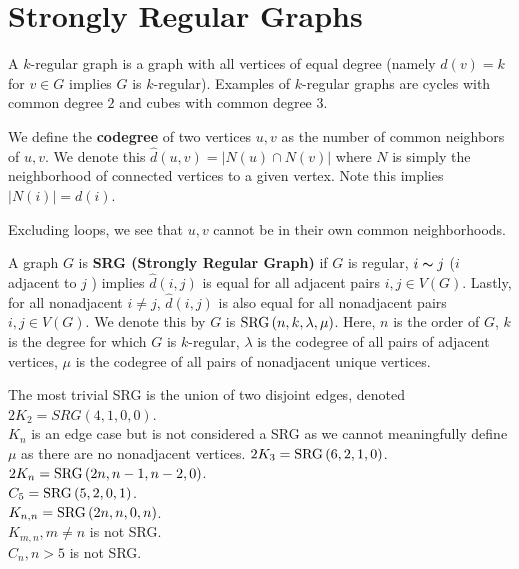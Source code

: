 \section{Strongly Regular Graphs}
\begin{recall}
	A $k$-regular graph is a graph with all vertices of equal degree (namely $d\left( v \right) = k$ for $v \in G$ implies $G$ is $k$-regular). Examples of $k$-regular graphs are cycles with common degree $2$ and cubes with common degree  $3$.
\end{recall}
\begin{definition}[Codegree]
	We define the \textbf{codegree} of two vertices $u, v$ as the number of common neighbors of $u, v$. We denote this $\hat{d}\left( u, v \right) = \left| N\left( u \right) \cap N\left( v \right)  \right| $ where $N$ is simply the neighborhood of connected vertices to a given vertex. Note this implies $\left| N\left( i \right)\right| = d\left( i \right) $.
\end{definition}
\begin{remark}
	Excluding loops, we see that $u, v$ cannot be in their own common neighborhoods.
\end{remark}
\begin{definition}
	A graph $G$ is  \textbf{SRG (Strongly Regular Graph)} if $G$ is regular, $i \thicksim j$ ($i$ adjacent to $j$ ) implies $\hat{d} \left( i, j \right) $ is equal for all adjacent pairs $i, j \in V\left( G \right) $. Lastly, for all nonadjacent $i \neq j$, $\hat{d} \left( i , j \right)$ is also equal for all nonadjacent pairs $i, j \in V\left( G \right) $. We denote this by $G$ is $\operatorname{SRG}\left( n, k, \lambda, \mu \right) $. Here, $n$ is the order of $G$, $k$ is the degree for which $G$ is $k$-regular, $\lambda$ is the codegree of all pairs of adjacent vertices, $\mu$ is the codegree of all pairs of nonadjacent unique vertices.
\end{definition}
\begin{example}
	The most trivial SRG is the union of two disjoint edges, denoted $2K_2 = SRG\left( 4, 1, 0, 0 \right) $.\\
	$K_{n}$ is an edge case but is not considered a SRG as we cannot meaningfully define $\mu$ as there are no nonadjacent vertices.
	$2K_3= \operatorname{SRG}\left( 6, 2, 1, 0 \right)$.\\
	$2K_{n} = \operatorname{SRG}\left( 2n, n-1, n-2, 0 \right) $.\\
	$C_5 = \operatorname{SRG}\left( 5, 2, 0, 1 \right) $.\\
	$K_{n, n}= \operatorname{SRG}\left( 2n, n, 0, n \right) $.\\
	$K_{m, n}, m\neq n$ is not SRG.\\
	$C_{n}, n>5$ is not SRG.\\
\end{example}
